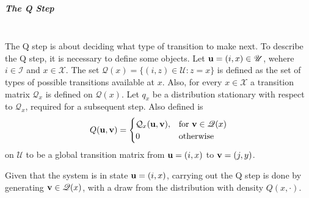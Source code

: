 \subparagraph{The Q Step}~\\
\noindent
The Q step is about deciding what type of transition to make next. 
To describe the Q step, it is necessary to define some objects. Let $\mathbf{u} = (i,x) \in {\mathscr U}$, wehere $i\in \mathscr I$ and $x\in\mathscr X$.
The set $\mathscr Q(x) = \{(i,z) \in \mathscr U : z = x\}$ is defined as the set of types of possible transitions available at $x$.
Also, for every $x \in \mathscr X$ a transition matrix $\mathcal Q_x$ is defined on $\mathscr Q(x)$. Let $q_x$ be a distribution stationary with respect to $\mathcal Q_x$, required for a subsequent step. 
Also defined is
	\begin{equation}
		Q(\mathbf{u},\mathbf{v}) = 
			\begin{cases}
			\mathcal Q_x(\mathbf{u},\mathbf{v}), & \text{for } \mathbf{v} \in \mathscr Q(x)\\
			0 & \text{otherwise} 
			\end{cases}
		\end{equation}
on $\mathscr U$ to be a global transition matrix from $\mathbf{u} = (i,x)$ to $\mathbf{v} = (j,y)$.

Given that the system is in state $\mathbf{u} = (i,x)$, carrying out the Q step is done by generating $\mathbf{v} \in \mathscr Q(x)$, with a draw from the distribution with density $Q(x,\cdot)$.

